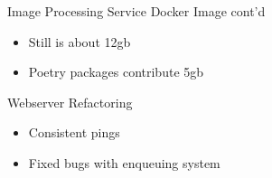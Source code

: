\begin{frame}{Image Processing Service Docker Image cont'd}
    \begin{itemize}
        \item Still is about 12gb
        \item Poetry packages contribute 5gb
    \end{itemize}    
\end{frame}

\begin{frame}{Webserver Refactoring}
    \begin{itemize}
        \item Consistent pings
        \item Fixed bugs with enqueuing system
    \end{itemize}    
\end{frame}
